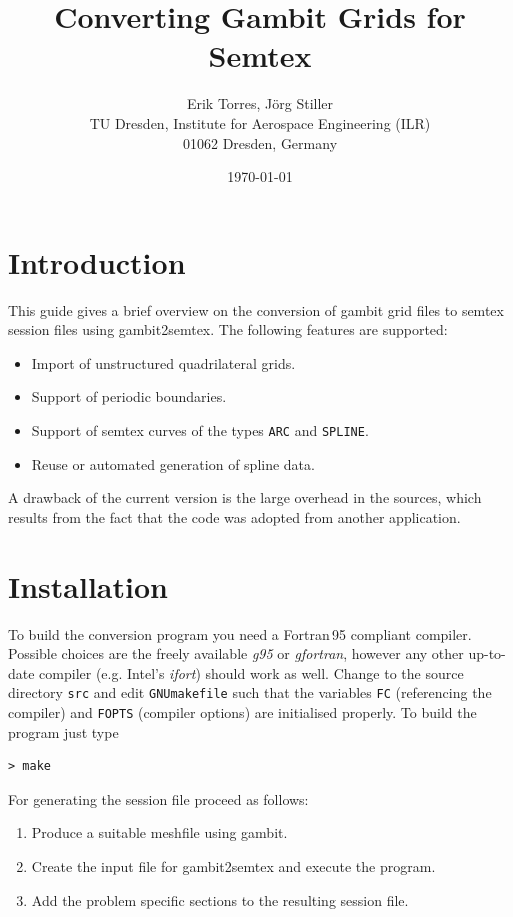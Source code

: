 \documentclass{article}
\begin{document}
\title{Converting Gambit Grids for Semtex}
\author{%
Erik Torres, J\"org Stiller \\[5mm] 
TU Dresden, Institute for Aerospace Engineering (ILR) \\ 
01062 Dresden, Germany}
\date{\today}
\maketitle

\section{Introduction}

This guide gives a brief overview on the conversion of gambit grid
files to semtex session files using gambit2semtex. 
The following features are supported:
\begin{itemize}
 \item Import of unstructured quadrilateral grids.
 \item Support of periodic boundaries.
 \item Support of semtex curves of the types \verb|ARC| and \verb|SPLINE|.
 \item Reuse or automated generation of spline data.
\end{itemize}
A drawback of the current version is the large overhead in the sources, which results from the fact that the code was adopted from another application.

\section{Installation}

To build the conversion program you need a Fortran\,95 compliant compiler. 
Possible choices are the freely available \emph{g95} or \emph{gfortran}, 
however any other up-to-date compiler (e.g. Intel's \emph{ifort}) should work 
as well. 
Change to the source directory \verb|src| and edit \texttt{GNUmakefile} 
such that the variables \verb|FC| (referencing the compiler) and \verb|FOPTS|
(compiler options) are initialised properly. To build the program just type 

\begin{verbatim}
> make
\end{verbatim}

For generating the session file proceed as follows: 
\begin{enumerate} 
 \item Produce a suitable meshfile using gambit.
 \item Create the input file for gambit2semtex and execute the program.
 \item Add the problem specific sections to the resulting session file. 
\end{enumerate}
\end{document}
